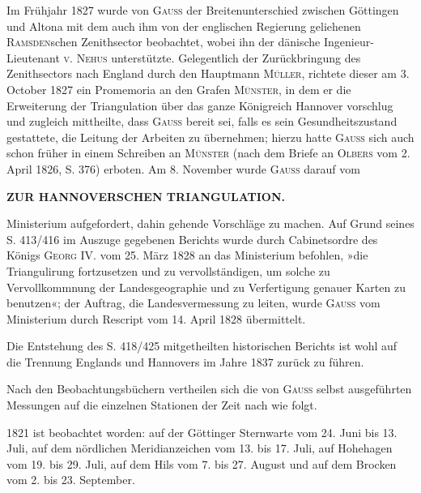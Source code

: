 \par\noindent\hspace*{\parindent}Im Frühjahr 1827 wurde von \textsc{Gauss} der Breitenunterschied zwischen Göttingen und Altona mit dem auch ihm von der englischen Regierung geliehenen \textsc{Ramsden}schen Zenithsector beobachtet, wobei ihn der dänische Ingenieur-Lieutenant \textsc{v. Nehus} unterstützte. Gelegentlich der Zurückbringung des Zenithsectors nach England durch den Hauptmann \textsc{Müller}, richtete dieser am 3. October 1827 ein Promemoria an den Grafen \textsc{Münster}, in dem er die Erweiterung der Triangulation über das ganze Königreich Hannover vorschlug und zugleich mittheilte, dass \textsc{Gauss} bereit sei, falls es sein Gesundheitszustand gestattete, die Leitung der Arbeiten zu übernehmen; hierzu hatte \textsc{Gauss} sich auch schon früher in einem Schreiben an \textsc{Münster} (nach dem Briefe an \textsc{Olbers} vom 2. April 1826, S. 376) erboten. Am 8. November wurde \textsc{Gauss} darauf vom

\par\clearpage
\noindent\null\hfill\textbf{ZUR HANNOVERSCHEN TRIANGULATION.}\hfill{}\par\medskip
\noindent Ministerium aufgefordert, dahin gehende Vorschläge zu machen. Auf Grund seines S. 413/416 im Auszuge gegebenen Berichts wurde durch Cabinetsordre des Königs \textsc{Georg} IV. vom 25. März 1828 an das Ministerium befohlen, »die Triangulirung fortzusetzen und zu vervollständigen, um solche zu Vervollkommnung der Landesgeographie und zu Verfertigung genauer Karten zu benutzen«; der Auftrag, die Landesvermessung zu leiten, wurde \textsc{Gauss} vom Ministerium durch Rescript vom 14. April 1828 übermittelt.

\par\noindent\hspace*{\parindent}Die Entstehung des S. 418/425 mitgetheilten historischen Berichts ist wohl auf die Trennung Englands und Hannovers im Jahre 1837 zurück zu führen.
\par\bigskip
\par\noindent\hspace*{\parindent}Nach den Beobachtungsbüchern vertheilen sich die von \textsc{Gauss} selbst ausgeführten Messungen auf die einzelnen Stationen der Zeit nach wie folgt.

\par\noindent\hspace*{\parindent}1821 ist beobachtet worden: auf der Göttinger Sternwarte vom 24. Juni bis 13. Juli, auf dem nördlichen Meridianzeichen vom 13. bis 17. Juli, auf Hohehagen vom 19. bis 29. Juli, auf dem Hils vom 7. bis 27. August und auf dem Brocken vom 2. bis 23. September.

